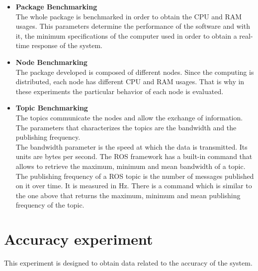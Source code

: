 	\begin{itemize}
		\item{\textbf{Package Benchmarking}}
		\\

		The whole package is benchmarked in order to obtain the CPU and RAM usages. 
		This parameters determine the performance of the software and with it, the minimum specifications of the computer used in order to obtain a real-time response of the system.  
		\\[0.5cm]

		\item{\textbf{Node Benchmarking}}
		\\

		The package developed is composed of different nodes. 
		Since the computing is distributed, each node has different CPU and RAM usages.
		That is why in these experiments the particular behavior of each node is evaluated. 
		\\[0.5cm]

		\item{\textbf{Topic Benchmarking}}\\

		The topics communicate the nodes and allow the exchange of information. 
		The parameters that characterizes the topics are the bandwidth and the publishing frequency.
		\\

		The bandwidth parameter is the speed at which the data is transmitted. 
		Its units are bytes per second. 
		The ROS framework has a built-in command that allows to retrieve the maximum, minimum and mean bandwidth of a topic. 
		\\

		The publishing frequency of a ROS topic is the number of messages published on it over time. 
		It is measured in Hz. 
		There is a command which is similar to the one above that returns the maximum, minimum and mean publishing frequency of the topic. 
			\end{itemize}

\newpage

\section{Accuracy experiment}

	This experiment is designed to obtain data related to the accuracy of the system. 
	\\

